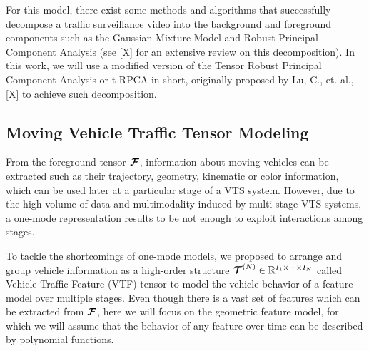 \documentclass[sensors,article,submit,moreauthors,pdftex]{Definitions/mdpi}
\newcommand{\mathmat}[1]{\boldsymbol{\mathbf{\MakeUppercase{#1}}}}
\newcommand{\mathten}[1]{\boldsymbol{\mathbf{\mathcal{\MakeUppercase{#1}}}}}
\begin{document}
For this model, there exist some methods and algorithms that successfully decompose a traffic surveillance video into the background and foreground components such as the Gaussian Mixture Model and Robust Principal Component Analysis (see [X] for an extensive review on this decomposition). In this work, we will use a modified version of the Tensor Robust Principal Component Analysis or t-RPCA in short, originally proposed by Lu, C., et. al., [X] to achieve such decomposition.

\subsection{Moving Vehicle Traffic Tensor Modeling}

From the foreground tensor $\mathten{F}$, information about moving vehicles can be extracted such as their trajectory, geometry, kinematic or color information, which can be used later at a particular stage of a VTS system. However, due to the high-volume of data and multimodality induced by multi-stage VTS systems, a one-mode representation results to be not enough to exploit interactions among stages.

To tackle the shortcomings of one-mode models, we proposed to arrange and group vehicle information as a high-order structure $\mathten{T}^{(N)} \in \mathbb{R}^{I_1 \times \cdots \times I_N}$ called Vehicle Traffic Feature (VTF) tensor to model the vehicle behavior of a feature model over multiple stages. Even though there is a vast set of features which can be extracted from $\mathten{F}$, here we will focus on the geometric feature model, for which we will assume that the behavior of any feature over time can be described by polynomial functions.



\end{document}
